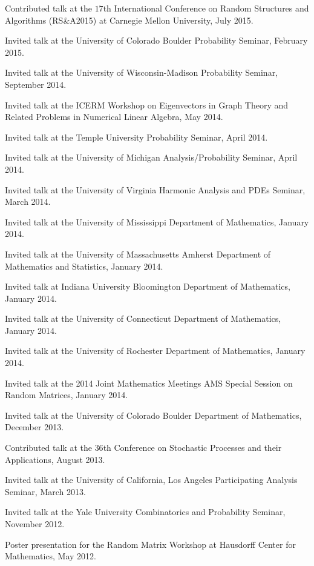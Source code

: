 \documentclass[letterpaper]{article}
\renewenvironment{itemize}{
  \begin{list}{}{
    \setlength{\leftmargin}{1em}
  }
}{
  \end{list}
}
\begin{document}
\begin{itemize}
	\item Contributed talk at the $17$th International Conference on Random Structures and Algorithms (RS\&A2015) at Carnegie Mellon University, July 2015.
	\item Invited talk at the University of Colorado Boulder Probability Seminar, February 2015.  
	\item Invited talk at the University of Wisconsin-Madison Probability Seminar, September 2014.  
	\item Invited talk at the ICERM Workshop on Eigenvectors in Graph Theory and Related Problems in Numerical Linear Algebra, May 2014.
	\item Invited talk at the Temple University Probability Seminar, April 2014.  
	\item Invited talk at the University of Michigan Analysis/Probability Seminar, April 2014.
	\item Invited talk at the University of Virginia Harmonic Analysis and PDEs Seminar, March 2014.	
	\item Invited talk at the University of Mississippi Department of Mathematics, January 2014.
	\item Invited talk at the University of Massachusetts Amherst Department of Mathematics and Statistics, January 2014.
	\item Invited talk at Indiana University Bloomington Department of Mathematics, January 2014.
	\item Invited talk at the University of Connecticut Department of Mathematics, January 2014.
	\item Invited talk at the University of Rochester Department of Mathematics, January 2014.
	\item Invited talk at the 2014 Joint Mathematics Meetings AMS Special Session on Random Matrices, January 2014.
	\item Invited talk at the University of Colorado Boulder Department of Mathematics, December 2013.
	\item Contributed talk at the $36$th Conference on Stochastic Processes and their Applications, August 2013.
	\item Invited talk at the University of California, Los Angeles Participating Analysis Seminar, March 2013.  
	\item Invited talk at the Yale University Combinatorics and Probability Seminar, November 2012.  
	\item Poster presentation for the Random Matrix Workshop at Hausdorff Center for Mathematics, May 2012.

\end{itemize}
\end{document}

